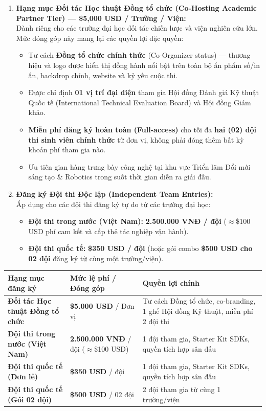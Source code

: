 \documentclass[12pt,a4paper]{article}
\begin{document}
\begin{enumerate}[label=\textbf{\arabic*.}]
\item \textbf{Hạng mục Đối tác Học thuật Đồng tổ chức (Co-Hosting Academic Partner Tier) --- \$5,000 USD / Trường / Viện:}\\
Dành riêng cho các trường đại học đối tác chiến lược và viện nghiên cứu lớn. Mức đóng góp này mang lại các quyền lợi đặc quyền:
\begin{itemize}
    \item Tư cách \textbf{Đồng tổ chức chính thức} (Co-Organizer status) --- thương hiệu và logo được hiển thị đồng hành nổi bật trên toàn bộ ấn phẩm số/in ấn, backdrop chính, website và kỷ yếu cuộc thi.
    \item Được chỉ định \textbf{01 vị trí đại diện} tham gia Hội đồng Đánh giá Kỹ thuật Quốc tế (International Technical Evaluation Board) và Hội đồng Giám khảo.
    \item \textbf{Miễn phí đăng ký hoàn toàn (Full-access)} cho tối đa \textbf{hai (02) đội thi sinh viên chính thức} từ đơn vị, không phải đóng thêm bất kỳ khoản phí tham gia nào.
    \item Ưu tiên gian hàng trưng bày công nghệ tại khu vực Triển lãm Đổi mới sáng tạo \& Robotics trong suốt thời gian diễn ra giải đấu.
\end{itemize}

\item \textbf{Đăng ký Đội thi Độc lập (Independent Team Entries):}\\
Áp dụng cho các đội thi đăng ký tự do từ các trường đại học:
\begin{itemize}
    \item \textbf{Đội thi trong nước (Việt Nam):} \textbf{2.500.000 VNĐ / đội} ($\approx$\$100 USD phí cam kết và cấp thẻ tác nghiệp vận hành).
    \item \textbf{Đội thi quốc tế:} \textbf{\$350 USD / đội} (hoặc gói combo \textbf{\$500 USD cho 02 đội} đăng ký từ cùng một trường/viện).
\end{itemize}
\end{enumerate}

\begin{center}
\begin{tabular}{lp{6.2cm}p{4.8cm}}
\toprule
\textbf{Hạng mục đăng ký} & \textbf{Mức lệ phí / Đóng góp} & \textbf{Quyền lợi chính} \\
\midrule
\textbf{Đối tác Học thuật Đồng tổ chức} & \textbf{\$5.000 USD} / Đơn vị & Tư cách Đồng tổ chức, co-branding, 1 ghế Hội đồng Kỹ thuật, miễn phí 2 đội thi \\
\textbf{Đội thi trong nước (Việt Nam)} & \textbf{2.500.000 VNĐ} / đội ($\approx$\$100 USD) & 1 đội tham gia, Starter Kit SDKs, quyền tích hợp sân đấu \\
\textbf{Đội thi quốc tế (Đơn lẻ)} & \textbf{\$350 USD} / đội & 1 đội tham gia, Starter Kit SDKs, quyền tích hợp sân đấu \\
\textbf{Đội thi quốc tế (Gói 02 đội)} & \textbf{\$500 USD} / 02 đội & 2 đội tham gia từ cùng 1 trường/viện \\
\bottomrule
\end{tabular}
\end{center}
\end{document}
